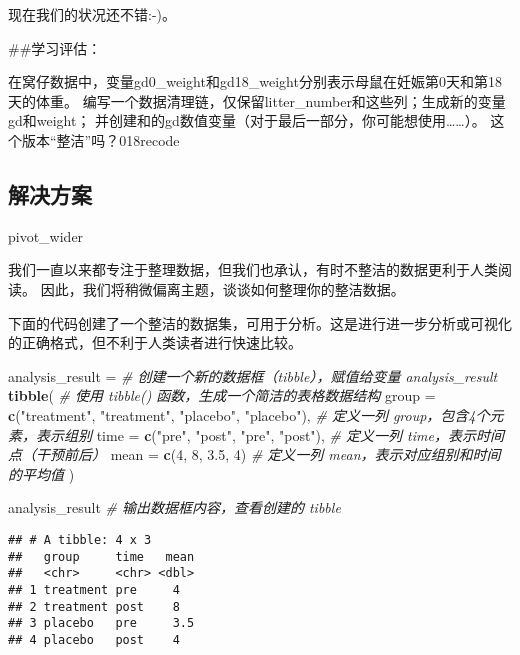 \documentclass[
]{article}
\newenvironment{Shaded}{\begin{snugshade}}{\end{snugshade}}
\newcommand{\AttributeTok}[1]{\textcolor[rgb]{0.13,0.29,0.53}{#1}}
\newcommand{\CommentTok}[1]{\textcolor[rgb]{0.56,0.35,0.01}{\textit{#1}}}
\newcommand{\DecValTok}[1]{\textcolor[rgb]{0.00,0.00,0.81}{#1}}
\newcommand{\FloatTok}[1]{\textcolor[rgb]{0.00,0.00,0.81}{#1}}
\newcommand{\FunctionTok}[1]{\textcolor[rgb]{0.13,0.29,0.53}{\textbf{#1}}}
\newcommand{\NormalTok}[1]{#1}
\newcommand{\OtherTok}[1]{\textcolor[rgb]{0.56,0.35,0.01}{#1}}
\newcommand{\StringTok}[1]{\textcolor[rgb]{0.31,0.60,0.02}{#1}}
\begin{document}
现在我们的状况还不错:-)。

\#\#学习评估：

在窝仔数据中，变量gd0\_weight和gd18\_weight分别表示母鼠在妊娠第0天和第18天的体重。
编写一个数据清理链，仅保留litter\_number和这些列；生成新的变量gd和weight；
并创建和的gd数值变量（对于最后一部分，你可能想使用\ldots\ldots）。
这个版本``整洁''吗？018recode

\subsection{解决方案}\label{ux89e3ux51b3ux65b9ux6848}

pivot\_wider

我们一直以来都专注于整理数据，但我们也承认，有时不整洁的数据更利于人类阅读。
因此，我们将稍微偏离主题，谈谈如何整理你的整洁数据。

下面的代码创建了一个整洁的数据集，可用于分析。这是进行进一步分析或可视化的正确格式，但不利于人类读者进行快速比较。

\begin{Shaded}
\begin{Highlighting}[]
\NormalTok{analysis\_result }\OtherTok{=}                         \CommentTok{\# 创建一个新的数据框（tibble），赋值给变量 analysis\_result}
  \FunctionTok{tibble}\NormalTok{(                                 }\CommentTok{\# 使用 tibble() 函数，生成一个简洁的表格数据结构}
    \AttributeTok{group =} \FunctionTok{c}\NormalTok{(}\StringTok{"treatment"}\NormalTok{, }\StringTok{"treatment"}\NormalTok{, }\StringTok{"placebo"}\NormalTok{, }\StringTok{"placebo"}\NormalTok{),  }\CommentTok{\# 定义一列 group，包含4个元素，表示组别}
    \AttributeTok{time =} \FunctionTok{c}\NormalTok{(}\StringTok{"pre"}\NormalTok{, }\StringTok{"post"}\NormalTok{, }\StringTok{"pre"}\NormalTok{, }\StringTok{"post"}\NormalTok{),                     }\CommentTok{\# 定义一列 time，表示时间点（干预前后）}
    \AttributeTok{mean =} \FunctionTok{c}\NormalTok{(}\DecValTok{4}\NormalTok{, }\DecValTok{8}\NormalTok{, }\FloatTok{3.5}\NormalTok{, }\DecValTok{4}\NormalTok{)                                      }\CommentTok{\# 定义一列 mean，表示对应组别和时间的平均值}
\NormalTok{  )}

\NormalTok{analysis\_result                          }\CommentTok{\# 输出数据框内容，查看创建的 tibble}
\end{Highlighting}
\end{Shaded}

\begin{verbatim}
## # A tibble: 4 x 3
##   group     time   mean
##   <chr>     <chr> <dbl>
## 1 treatment pre     4  
## 2 treatment post    8  
## 3 placebo   pre     3.5
## 4 placebo   post    4
\end{verbatim}
\end{document}
